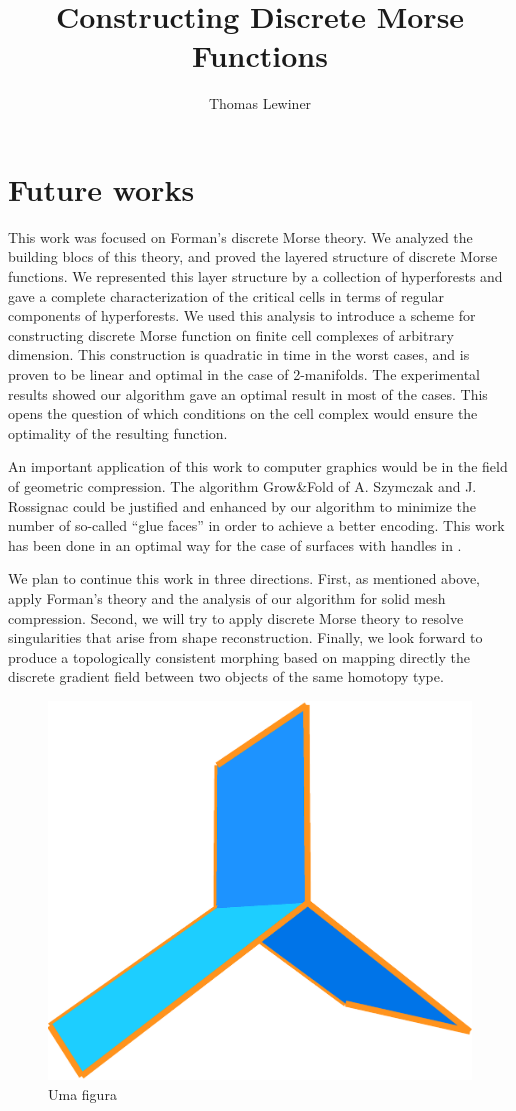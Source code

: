 \documentclass[msc,twoside,british]{ThesisPUC_uk}
\author{Thomas Lewiner}
\title{Constructing Discrete Morse Functions}
\begin{document}
\chapter{Future works}

This work was focused on Forman's discrete Morse theory. We analyzed the building blocs of this theory, and proved the layered structure of discrete Morse functions. We represented this layer structure by a collection of hyperforests and gave a complete characterization of the critical cells in terms of regular components of hyperforests. We used this analysis to introduce a scheme for constructing discrete Morse function on finite cell complexes of arbitrary dimension. This construction is quadratic in time in the worst cases, and is proven to be linear and optimal in the case of 2-manifolds. The experimental results showed our algorithm gave an optimal result in most of the cases. This opens the question of which conditions on the cell complex would ensure the optimality of the resulting function.

An important application of this work to computer graphics would be in the field of geometric compression. The algorithm Grow\&Fold of A. Szymczak and J. Rossignac \cite{Szy00} could be justified and enhanced by our algorithm to minimize the number of so-called ``glue faces'' in order to achieve a better encoding. This work has been done in an optimal way for the case of surfaces with handles in \cite{Lop02}.

We plan to continue this work in three directions. First, as mentioned above, apply Forman's theory and the analysis of our algorithm for solid mesh compression. Second, we will try to apply discrete Morse theory to resolve singularities that arise from shape reconstruction. Finally, we look forward to produce a topologically consistent morphing based on mapping directly the discrete gradient field between two objects of the same homotopy type.

\begin{figure}
  \includegraphics*[width=\linewidth]{ctor4_none.eps}
  \caption{Uma figura}
\end{figure}


\end{document}
